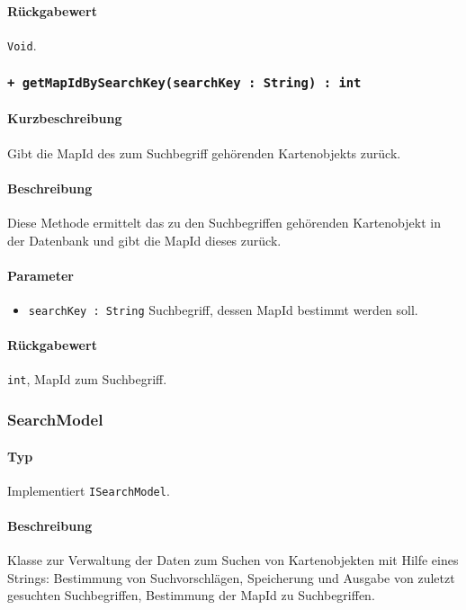 \paragraph*{Rückgabewert}
\texttt{Void}.

 \subsubsection*{\texttt{+ getMapIdBySearchKey(searchKey : String) : int}}\label{App_Search_ISearchModel_getMapIdBySearchKey}%
\paragraph*{Kurzbeschreibung}
Gibt die MapId des zum Suchbegriff gehörenden Kartenobjekts zurück.
\paragraph*{Beschreibung}
Diese Methode ermittelt das zu den Suchbegriffen gehörenden Kartenobjekt in der Datenbank und gibt die MapId dieses zurück.
\paragraph*{Parameter}
\begin{itemize}
    \item \texttt{searchKey : String} Suchbegriff, dessen MapId bestimmt werden soll.
\end{itemize}
\paragraph*{Rückgabewert}
\texttt{int}, MapId zum Suchbegriff.


\subsubsection{SearchModel}\label{App_Search_SearchModel}
\paragraph*{Typ}
Implementiert \texttt{ISearchModel}.
\paragraph*{Beschreibung}
Klasse zur Verwaltung der Daten zum Suchen von Kartenobjekten mit Hilfe eines Strings: 
Bestimmung von Suchvorschlägen, Speicherung und Ausgabe von zuletzt gesuchten Suchbegriffen, Bestimmung der MapId zu Suchbegriffen.